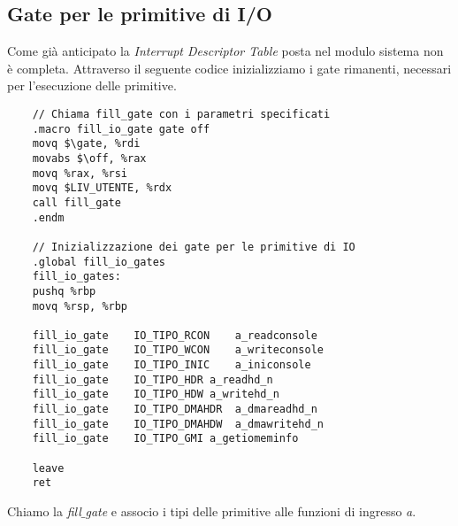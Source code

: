 \subsection{Gate per le primitive di I/O}
Come già anticipato la \emph{Interrupt  Descriptor Table} posta nel modulo sistema non è completa. Attraverso il seguente codice inizializziamo i gate rimanenti, necessari per l'esecuzione delle primitive.
\small 
\begin{verbatim}
	// Chiama fill_gate con i parametri specificati
	.macro fill_io_gate gate off
	movq $\gate, %rdi
	movabs $\off, %rax
	movq %rax, %rsi
	movq $LIV_UTENTE, %rdx
	call fill_gate
	.endm
	
	// Inizializzazione dei gate per le primitive di IO
	.global fill_io_gates
	fill_io_gates:
	pushq %rbp
	movq %rsp, %rbp
	
	fill_io_gate	IO_TIPO_RCON	a_readconsole
	fill_io_gate	IO_TIPO_WCON	a_writeconsole
	fill_io_gate	IO_TIPO_INIC	a_iniconsole
	fill_io_gate	IO_TIPO_HDR	a_readhd_n
	fill_io_gate	IO_TIPO_HDW	a_writehd_n
	fill_io_gate	IO_TIPO_DMAHDR	a_dmareadhd_n
	fill_io_gate	IO_TIPO_DMAHDW	a_dmawritehd_n
	fill_io_gate	IO_TIPO_GMI	a_getiomeminfo
	
	leave
	ret
\end{verbatim}
\normalsize 
Chiamo la \emph{fill$\_$gate} e associo i tipi delle primitive alle funzioni di ingresso \emph{a}. 

